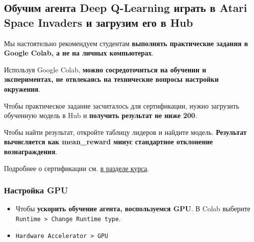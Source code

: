 \documentclass[11pt,a4paper]{article}
\begin{document}
\subsection{Обучим агента Deep Q-Learning играть в Atari Space Invaders и загрузим его в Hub}\label{lets-train-a-deep-q-learning-agent-playing-atari-space-invaders-space-invaders-and-upload-it-to-the-hub.}

Мы настоятельно рекомендуем студентам \textbf{выполнять практические задания в Google Colab, а не на личных компьютерах}.

Используя Google Colab, \textbf{можно сосредоточиться на обучении и экспериментах, не отвлекаясь на технические вопросы настройки окружения}.

Чтобы практическое задание засчиталось для сертификации, нужно загрузить обученную модель в Hub и \textbf{получить результат не ниже 200}.

Чтобы найти результат, откройте таблицу лидеров и найдите модель. \textbf{Результат вычисляется как mean\_reward минус стандартное отклонение вознаграждения}.

Подробнее о сертификации см. \href{https://huggingface.co/deep-rl-course/en/unit0/introduction#certification-process}{в разделе курса}.

\subsubsection{Настройка GPU}\label{set-the-gpu}

\begin{itemize}
\tightlist
\item
Чтобы \textbf{ускорить обучение агента, воспользуемся GPU}. В Colab выберите \texttt{Runtime\ \textgreater{}\ Change\ Runtime\ type}.
\end{itemize}


\begin{itemize}
\tightlist
\item
\texttt{Hardware\ Accelerator\ \textgreater{}\ GPU}
\end{itemize}

\end{document}
